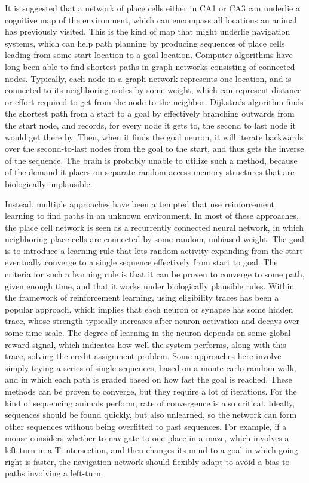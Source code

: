 \documentclass{article}
\begin{document}
    It is suggested that a network of place cells either in CA1 or CA3 can underlie a cognitive map of the environment, which can encompass all locations an animal has previously visited. This is the kind of map that might underlie navigation systems, which can help path planning by producing sequences of place cells leading from some start location to a goal location.
    Computer algorithms have long been able to find shortest paths in graph networks consisting of connected nodes. Typically, each node in a graph network represents one location, and is connected to its neighboring nodes by some weight, which can represent distance or effort required to get from the node to the neighbor.
    Dijkstra's algorithm finds the shortest path from a start to a goal by effectively branching outwards from the start node, and records, for every node it gets to, the second to last node it would get there by. Then, when it finds the goal neuron, it will iterate backwards over the second-to-last nodes from the goal to the start, and thus gets the inverse of the sequence. The brain is probably unable to utilize such a method, because of the demand it places on separate random-access memory structures that are biologically implausible.
    
    Instead, multiple approaches have been attempted that use reinforcement learning to find paths in an unknown environment. In most of these approaches, the place cell network is seen as a recurrently connected neural network, in which neighboring place cells are connected by some random, unbiased weight. The goal is to introduce a learning rule that lets random activity expanding from the start eventually converge to a single sequence effectively from start to goal. The criteria for such a learning rule is that it can be proven to converge to some path, given enough time, and that it works under biologically plausible rules. 
    Within the framework of reinforcement learning, using eligibility traces has been a popular approach, which implies that each neuron or synapse has some hidden trace, whose strength typically increases after neuron activation and decays over some time scale. The degree of learning in the neuron depends on some global reward signal, which indicates how well the system performs, along with this trace, solving the credit assignment problem. 
    Some approaches here involve simply trying a series of single sequences, based on a monte carlo random walk, and in which each path is graded based on how fast the goal is reached. These methods can be proven to converge, but they require a lot of iterations. For the kind of sequencing animals perform, rate of convergence is also critical. Ideally, sequences should be found quickly, but also unlearned, so the network can form other sequences without being overfitted to past sequences. 
    For example, if a mouse considers whether to navigate to one place in a maze, which involves a left-turn in a T-intersection, and then changes its mind to a goal in which going right is faster, the navigation network should flexibly adapt to avoid a bias to paths involving a left-turn.
    
\end{document}
